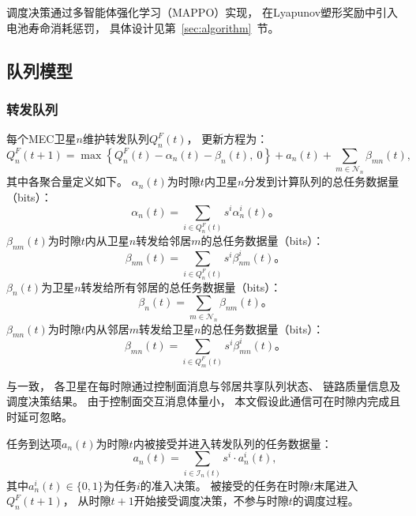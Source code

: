 \documentclass[a4paper,11pt]{article}
\begin{document}
调度决策通过多智能体强化学习（MAPPO）实现，
在Lyapunov塑形奖励中引入电池寿命消耗惩罚，
具体设计见第~\ref{sec:algorithm}~节。

\subsection{队列模型}

\subsubsection{转发队列}

每个MEC卫星$n$维护转发队列$Q^F_n(t)$，
更新方程为\cite{zhang2024mhspo}：
\begin{equation}
    Q^F_n(t\!+\!1) = \max\!\left\{Q^F_n(t)
    - \alpha_n(t) - \beta_n(t),~0\right\}
    + a_n(t)
    + \sum_{m \in \mathcal{N}_n}\!\beta_{mn}(t),
    \label{eq:QF_update}
\end{equation}
其中各聚合量定义如下。
$\alpha_n(t)$为时隙$t$内卫星$n$分发到计算队列的总任务数据量（bits）：
\begin{equation}
    \alpha_n(t) = \sum_{i \in Q^F_n(t)} s^i \alpha^i_n(t)。
\end{equation}
$\beta_{nm}(t)$为时隙$t$内从卫星$n$转发给邻居$m$的总任务数据量（bits）：
\begin{equation}
    \beta_{nm}(t) = \sum_{i \in Q^F_n(t)} s^i \beta^i_{nm}(t)。
\end{equation}
$\beta_n(t)$为卫星$n$转发给所有邻居的总任务数据量（bits）：
\begin{equation}
    \beta_n(t) = \sum_{m \in \mathcal{N}_n} \beta_{nm}(t)。
\end{equation}
$\beta_{mn}(t)$为时隙$t$内从邻居$m$转发给卫星$n$的总任务数据量（bits）：
\begin{equation}
    \beta_{mn}(t) = \sum_{i \in Q^F_m(t)} s^i \beta^i_{mn}(t)。
\end{equation}

与\cite{zhang2024mhspo}一致，
各卫星在每时隙通过控制面消息与邻居共享队列状态、
链路质量信息及调度决策结果。
由于控制面交互消息体量小，
本文假设此通信可在时隙内完成且时延可忽略。

任务到达项$a_n(t)$为时隙$t$内被接受并进入转发队列的任务数据量：
\begin{equation}
    a_n(t) = \sum_{i \in \mathcal{I}_n(t)} s^i \cdot a^i_n(t),
    \label{eq:arrival}
\end{equation}
其中$a^i_n(t) \in \{0,1\}$为任务$i$的准入决策。
被接受的任务在时隙$t$末尾进入$Q^F_n(t+1)$，
从时隙$t+1$开始接受调度决策，不参与时隙$t$的调度过程。
\end{document}
